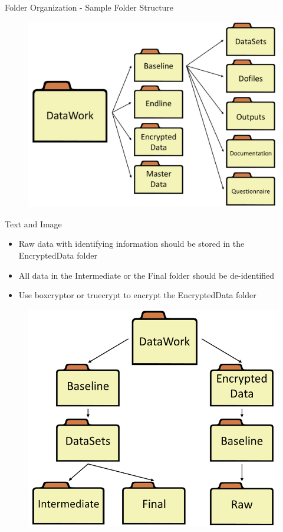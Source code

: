 \documentclass[aspectratio=169]{beamer}
\begin{document}
\begin{frame}{Folder Organization - Sample Folder Structure}
	\begin{figure}
		\centering
		\includegraphics[width=.7\linewidth]{img/folderstructure}
	\end{figure}
\end{frame}

\begin{frame}[fragile]{Text and Image}
\begin{multicols}{2}	
	\begin{itemize}
		\item Raw data with identifying information should be stored in the EncryptedData folder
		\item All data in the Intermediate or the Final folder should be de-identified
		\item Use boxcryptor or truecrypt to encrypt the EncryptedData folder
	\end{itemize}
	\begin{figure}
		\centering
		\includegraphics[width=\linewidth]{img/folderstructure2}
	\end{figure}
\end{multicols}
\end{frame}
\end{document}

